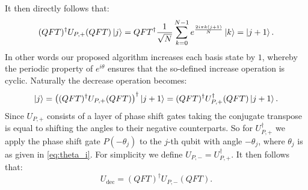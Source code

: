 It then directly follows that: 
\begin{equation}
    (QFT)^\dagger U_{P,+} (QFT) \ket{j} = QFT^\dagger \frac{1}{\sqrt{N}} \sum_{k=0}^{N-1} e^{\frac{2 i \pi k (j+1)}{N}}\ket{k}  = \ket{j+1}.
\end{equation}
In other words our proposed algorithm increases each basis state by $1$, whereby the periodic property of $e^{i\theta}$ ensures that the so-defined increase operation is cyclic. Naturally the decrease operation becomes:
\begin{equation}
    \ket{j} =  \left ( (QFT)^\dagger U_{P,+} (QFT) \right )^\dagger \ket{j+1} = (QFT)^\dagger U_{P,+}^\dagger (QFT) \ket{j+1}.
\end{equation}
Since $U_{P,+}$ consists of a layer of phase shift gates taking the conjugate transpose is equal to shifting the angles to their negative counterparts. So for $U_{P,+}^\dagger$ we apply the phase shift gate $P(-\theta_j)$ to the $j$-th qubit with angle $-\theta_j$, where $\theta_j$ is as given in \eqref{eq:theta_i}.
For simplicity we define $U_{P,-} = U_{P,+}^\dagger$. It then follows that: 
\begin{equation}
    U_{\text{dec}} = (QFT)^\dagger U_{P,-} (QFT).
\end{equation}
 





